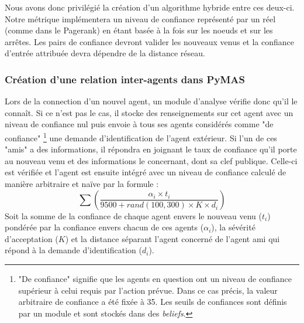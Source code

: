 \documentclass[11pt]{book}
\begin{document}
Nous avons donc privilégié la création d'un algorithme hybride entre ces 
deux-ci. Notre métrique implémentera un niveau de confiance représenté par un
réel (comme dans le Pagerank) en étant basée à la fois sur les noeuds et sur 
les arrêtes. Les pairs de confiance devront valider les nouveaux venus et 
la confiance d'entrée attribuée devra dépendre de la distance réseau.

\subsubsection{Création d'une relation inter-agents dans PyMAS}
Lors de la connection d'un nouvel agent, un module d'analyse vérifie donc 
qu'il le connaît. Si ce n’est pas le cas, il stocke des renseignements sur 
cet agent avec un niveau de confiance nul puis envoie à tous ses agents
considérés comme "de confiance" \footnote{"De confiance" signifie que les 
agents en question ont un niveau de confiance supérieur à celui requis par 
l'action prévue. Dans ce cas précis, la valeur arbitraire de confiance a été 
fixée à 35. Les seuils de confiances sont définis par un module et sont 
stockés dans des \textit{beliefs}.} une demande d'identification de l'agent 
extérieur. Si l'un de ces "amis" a des informations, il répondra en joignant 
le taux de confiance qu'il porte au nouveau venu et des informations le 
concernant, dont sa clef publique. Celle-ci est vérifiée et l'agent est 
ensuite intégré avec un niveau de confiance calculé de manière arbitraire et 
naïve par la formule : 
\[ \sum \left ( \frac{\alpha_{i} \times t_{i}}{9500 + rand(100,300) \times 
K \times d_{i} } \right ) \]
Soit la somme de la confiance de chaque agent envers le nouveau venu 
($t_{i}$) pondérée par la confiance envers chacun de ces agents 
($\alpha_{i}$), la sévérité d'acceptation ($K$) et la distance séparant 
l'agent concerné de l'agent ami qui répond à la demande d'identification 
($d_{i}$). 
\end{document}
